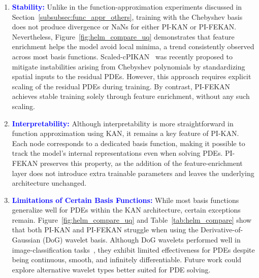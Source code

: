 \documentclass{article}
\begin{document}
\begin{enumerate}
    Figure~\ref{fig:helm_relu} highlights the benefits of feature enrichment via PI-FEKAN, despite its slightly higher computational cost compared to PI-KAN with the ReLU basis. Increasing the grid size $G$ from 5 to 7 for PI-KAN reduces the relative $L_2$ error but also increases computational cost. Importantly, the cost of PI-KAN at $G=7$ is comparable to that of PI-FEKAN at $G=5$, yet the relative $L_2$ error for PI-FEKAN is an order of magnitude lower. This demonstrates that the additional cost of PI-FEKAN is justified. A similar argument applies to HReLU, as it is analogous to ReLU except for its higher-order construction.


    \item \textcolor{blue}{\textbf{Stability:}}  
     Unlike in the function-approximation experiments discussed in Section~\ref{subsubsec:func_appr_others}, training with the Chebyshev basis does not produce divergence or NaNs for either PI-KAN or PI-FEKAN. Nevertheless, Figure~\ref{fig:helm_compare_uq} demonstrates that feature enrichment helps the model avoid local minima, a trend consistently observed across most basis functions. Scaled-cPIKAN~\cite{mostajeran2025scaled} was recently proposed to mitigate instabilities arising from Chebyshev polynomials by standardizing spatial inputs to the residual PDEs. However, this approach requires explicit scaling of the residual PDEs during training. By contrast, PI-FEKAN achieves stable training solely through feature enrichment, without any such scaling.

        
    \item \textcolor{blue}{\textbf{Interpretability:}}  
    Although interpretability is more straightforward in function approximation using KAN, it remains a key feature of PI-KAN. Each node corresponds to a dedicated basis function, making it possible to track the model’s internal representations even when solving PDEs. PI-FEKAN preserves this property, as the addition of the feature-enrichment layer does not introduce extra trainable parameters and leaves the underlying architecture unchanged.

    \item \textcolor{blue}{\textbf{Limitations of Certain Basis Functions:}}  
    While most basis functions generalize well for PDEs within the KAN architecture, certain exceptions remain. Figure~\ref{fig:helm_compare_uq} and Table~\ref{tab:helm_compare} show that both PI-KAN and PI-FEKAN struggle when using the Derivative-of-Gaussian (DoG) wavelet basis. Although DoG wavelets performed well in image-classification tasks~\cite{bozorgasl2405wav}, they exhibit limited effectiveness for PDEs despite being continuous, smooth, and infinitely differentiable. Future work could explore alternative wavelet types better suited for PDE solving.
\end{enumerate}
\end{document}
